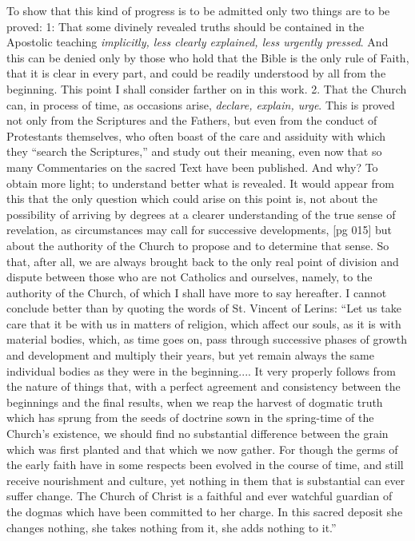 To show that this kind of progress is to be admitted
only two things are to be proved: 1: That
some divinely revealed truths should be contained
in the Apostolic teaching \emph{implicitly, less clearly
explained, less urgently pressed}. And this can be
denied only by those who hold that the Bible is the
only rule of Faith, that it is clear in every part,
and could be readily understood by all from the
beginning. This point I shall consider farther on
in this work. 2. That the Church can, in process
of time, as occasions arise, \emph{declare, explain, urge}.
This is proved not only from the Scriptures and
the Fathers, but even from the conduct of Protestants
themselves, who often boast of the care
and assiduity with which they “search the Scriptures,”
and study out their meaning, even now
that so many Commentaries on the sacred Text
have been published. And why? To obtain more
light; to understand better what is revealed. It
would appear from this that the only question
which could arise on this point is, not about the
possibility of arriving by degrees at a clearer understanding
of the true sense of revelation, as circumstances
may call for successive developments,
[pg 015]
but about the authority of the Church to propose
and to determine that sense. So that, after all,
we are always brought back to the only real point
of division and dispute between those who are not
Catholics and ourselves, namely, to the authority
of the Church, of which I shall have more to say
hereafter. I cannot conclude better than by quoting
the words of St. Vincent of Lerins: “Let us
take care that it be with us in matters of religion,
which affect our souls, as it is with material bodies,
which, as time goes on, pass through successive
phases of growth and development and multiply
their years, but yet remain always the same individual
bodies as they were in the beginning....
It very properly follows from the nature of things
that, with a perfect agreement and consistency between
the beginnings and the final results, when
we reap the harvest of dogmatic truth which has
sprung from the seeds of doctrine sown in the
spring-time of the Church's existence, we should
find no substantial difference between the grain
which was first planted and that which we now
gather. For though the germs of the early faith
have in some respects been evolved in the course
of time, and still receive nourishment and culture,
yet nothing in them that is substantial can ever
suffer change. The Church of Christ is a faithful
and ever watchful guardian of the dogmas which
have been committed to her charge. In this sacred
deposit she changes nothing, she takes nothing
from it, she adds nothing to it.”

